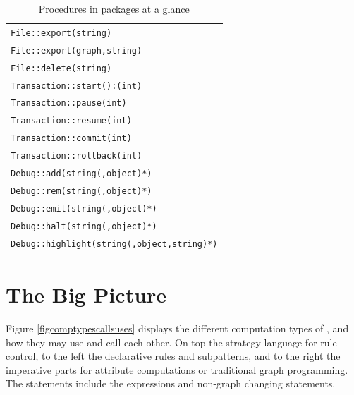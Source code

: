 \begin{table}[htbp]
\centering
\begin{tabular}{|l|}
\hline
\texttt{File::export(string)}\\
\texttt{File::export(graph,string)}\\
\texttt{File::delete(string)}\\
\hline
\texttt{Transaction::start():(int)}\\
\texttt{Transaction::pause(int)}\\
\texttt{Transaction::resume(int)}\\
\texttt{Transaction::commit(int)}\\
\texttt{Transaction::rollback(int)}\\
\hline
\texttt{Debug::add(string(,object)*)}\\
\texttt{Debug::rem(string(,object)*)}\\
\texttt{Debug::emit(string(,object)*)}\\
\texttt{Debug::halt(string(,object)*)}\\
\texttt{Debug::highlight(string(,object,string)*)}\\
\hline
\end{tabular}
\caption{Procedures in packages at a glance}
\label{packageprocstab}
\end{table}

\pagebreak

\section{The Big Picture}
Figure \ref{figcomptypescallsuses} displays the different computation types of \GrG, and how they may use and call each other. On top the strategy language for rule control, to the left the declarative rules and subpatterns, and to the right the imperative parts for attribute computations or traditional graph programming. The statements include the expressions and non-graph changing statements.

